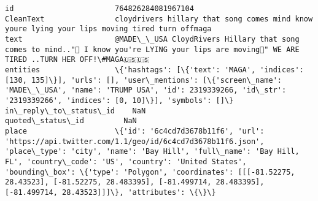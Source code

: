 \documentclass[11pt]{article}
\begin{document}
\begin{Verbatim}[commandchars=\\\{\}]
id                       764826284081967104                                                                                                                                                                                                                                                                                                                                                                              
CleanText                cloydrivers hillary that song comes mind know youre lying your lips moving tired turn offmaga                                                                                                                                                                                                                                                                                                   
text                     @MADE\_\_USA CloydRivers Hillary that song comes to mind.."🎼 I know you're LYING your lips are moving🎤" WE ARE TIRED ..TURN HER OFF!\#MAGA🇺🇸🇺🇸                                                                                                                                                                                                                                                     
entities                 \{'hashtags': [\{'text': 'MAGA', 'indices': [130, 135]\}], 'urls': [], 'user\_mentions': [\{'screen\_name': 'MADE\_\_USA', 'name': 'TRUMP USA', 'id': 2319339266, 'id\_str': '2319339266', 'indices': [0, 10]\}], 'symbols': []\}                                                                                                                                                                          
in\_reply\_to\_status\_id    NaN                                                                                                                                                                                                                                                                                                                                                                                             
quoted\_status\_id         NaN                                                                                                                                                                                                                                                                                                                                                                                             
place                    \{'id': '6c4cd7d3678b11f6', 'url': 'https://api.twitter.com/1.1/geo/id/6c4cd7d3678b11f6.json', 'place\_type': 'city', 'name': 'Bay Hill', 'full\_name': 'Bay Hill, FL', 'country\_code': 'US', 'country': 'United States', 'bounding\_box': \{'type': 'Polygon', 'coordinates': [[[-81.52275, 28.43523], [-81.52275, 28.483395], [-81.499714, 28.483395], [-81.499714, 28.43523]]]\}, 'attributes': \{\}\}

\end{Verbatim}
\end{document}
